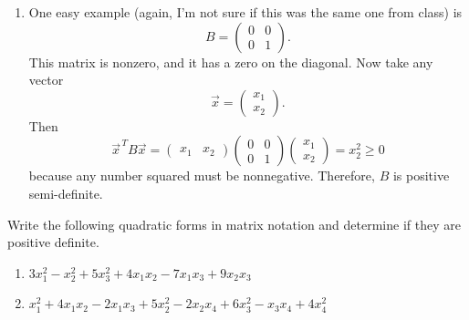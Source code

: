 \documentclass[10pt]{extarticle}
\begin{document}
\begin{enumerate}[label=(\alph*)]
\item One easy example (again, I'm not sure if this was the same one from class) is
\[
B=
\begin{pmatrix}
0 & 0\\
0 & 1
\end{pmatrix}.
\]
This matrix is nonzero, and it has a zero on the diagonal. Now take any vector
\[
\vec{x}=
\begin{pmatrix}
x_1\\
x_2
\end{pmatrix}.
\]
Then
\[
\vec{x}^{\,T}B\vec{x}
=
\begin{pmatrix}
x_1 & x_2
\end{pmatrix}
\begin{pmatrix}
0 & 0\\
0 & 1
\end{pmatrix}
\begin{pmatrix}
x_1\\
x_2
\end{pmatrix}
=x_2^2\ge 0
\]
because any number squared must be nonnegative. Therefore, $B$ is positive semi-definite.
\end{enumerate}

\newpage

\begin{problem}[Problem 3]
Write the following quadratic forms in matrix notation and determine if they are positive definite.
\begin{enumerate}[label=(\alph*)]
\item $3x_1^2-x_2^2+5x_3^2+4x_1x_2-7x_1x_3+9x_2x_3$
\item $x_1^2+4x_1x_2-2x_1x_3+5x_2^2-2x_2x_4+6x_3^2-x_3x_4+4x_4^2$
\end{enumerate}
\end{problem}
\end{document}
